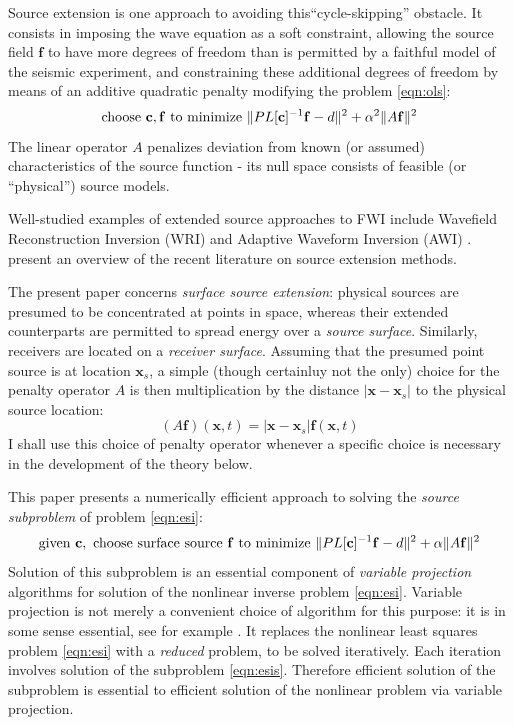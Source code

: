 \documentclass[12pt]{geophysics}
\newcommand{\bx}{\mathbf{x}}
\newcommand{\bff}{\mathbf{f}}
\begin{document}
Source extension is one approach to avoiding this``cycle-skipping''
obstacle. It consists in imposing the wave equation as a soft
constraint, allowing the source field $\bff$ to have more degrees of
freedom than is permitted by a faithful model of the seismic
experiment, and constraining these additional degrees of freedom by
means of an additive quadratic penalty modifying the problem
\ref{eqn:ols}:
\begin{equation}
\label{eqn:esi}
\mbox{choose } {\bf c}, \bff \mbox{ to minimize } \|PL[{\bf c}]^{-1}\bff -d \|^2 + \alpha^2 \|A\bff\|^2 
\end{equation}
The linear operator $A$ penalizes deviation from known (or assumed)
characteristics of the source function - its null space consists of
feasible (or ``physical'') source models.

Well-studied examples of extended source approaches to FWI include
Wavefield Reconstruction Inversion (WRI)  \cite[]{LeeuwenHerrmannWRI:13,LeeuwenHerrmann:16,Lietal:18,Aghmiryetal:20,Louboutinetal:20} and Adaptive Waveform
Inversion (AWI)
\cite[]{Warner:16,GuachWarnerRavaut:GEO19,Guaschetal:NPJDM20,Yongetal:EAGE21,Warneretal:SEG21}. \cite{HuangNammourSymesDollizal:SEG19}
present an overview of the recent
literature on source extension methods.

The present paper concerns {\em surface source extension}: physical
sources are presumed to be concentrated at points in space, whereas
their extended counterparts are permitted to spread energy over a {\em
  source surface}. Similarly, receivers are located on a {\em receiver
  surface}. Assuming that the presumed point source is at location
$\bx_s$, a simple (though certainluy not the only) choice for the
penalty operator $A$ is then multiplication by the distance
$|\bx-\bx_s|$ to the physical source location:
\begin{equation}
  \label{eqn:penop}
  (A\bff)(\bx,t) = |\bx-\bx_s|\bff(\bx,t)
\end{equation}
I shall use this choice of penalty operator whenever a specific choice
is necessary in the development of the theory below.

This paper presents a numerically efficient approach to solving the
{\em source subproblem} of problem \ref{eqn:esi}:
\begin{equation}
\label{eqn:esis}
\mbox{given } {\bf c}, \mbox{ choose surface source } \bff \mbox{ to minimize }
\|PL[{\bf c}]^{-1}\bff -d \|^2 + \alpha \|A\bff\|^2 
\end{equation}
Solution of this subproblem is an essential component of {\em variable
  projection} algorithms for solution of the nonlinear inverse problem
\ref{eqn:esi}. Variable projection is not merely a convenient choice
of algorithm for this purpose: it is in some sense essential, see for
example \cite{Symes:SEG20}. It replaces the nonlinear
least squares problem \ref{eqn:esi} with a {\em reduced} problem, to
be solved iteratively. Each iteration involves solution of the
subproblem \ref{eqn:esis}. Therefore efficient solution of the
subproblem is essential to efficient solution of the nonlinear problem
via variable projection.
\end{document}

